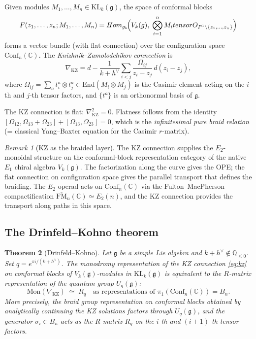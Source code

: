 \documentclass[11pt]{article}
\newtheorem{theorem}{Theorem}[section]
\theoremstyle{definition}
\theoremstyle{remark}
\newtheorem{remark}[theorem]{Remark}
\newcommand{\Uq}{U_q}
\newcommand{\FM}{\overline{\mathrm{FM}}}
\providecommand{\End}{}
\renewcommand{\End}{\mathrm{End}}
\providecommand{\Hom}{}
\renewcommand{\Hom}{\mathrm{Hom}}
\newcommand{\cF}{\mathcal{F}}
\newcommand{\cO}{\mathcal{O}}
\newcommand{\frakg}{\mathfrak{g}}
\newcommand{\KL}{\mathrm{KL}}
\newcommand{\KZ}{\mathrm{KZ}}
\newcommand{\hv}{h^\vee}
\begin{document}
Given modules $M_1, \ldots, M_n \in \KL_k(\frakg)$, the space of
conformal blocks
\[
 \cF(z_1, \ldots, z_n; M_1, \ldots, M_n)
 = \Hom_{\hat{\frakg}_k}\!\Bigl(V_k(\frakg),\;
 \bigotimes_{i=1}^n M_i \otimes \cO_{\mathbb{P}^1 \setminus \{z_1,\ldots,z_n\}}\Bigr)
\]
forms a vector bundle (with flat connection) over the configuration space
$\mathrm{Conf}_n(\mathbb{C})$. The \emph{Knizhnik--Zamolodchikov connection} is
\begin{equation}\label{eq:kz}
 \nabla_{\KZ} = d - \frac{1}{k + \hv} \sum_{i < j}
 \frac{\Omega_{ij}}{z_i - z_j}\, d(z_i - z_j),
\end{equation}
where $\Omega_{ij} = \sum_a t^a_i \otimes t^a_j \in \End(M_i \otimes M_j)$
is the Casimir element acting on the $i$-th and $j$-th tensor factors,
and $\{t^a\}$ is an orthonormal basis of $\frakg$.

The KZ connection is flat: $\nabla_{\KZ}^2 = 0$. Flatness follows from
the identity $[\Omega_{12}, \Omega_{13} + \Omega_{23}] + [\Omega_{13}, \Omega_{23}] = 0$,
which is the \emph{infinitesimal pure braid relation} (= classical Yang--Baxter
equation for the Casimir $r$-matrix).

\begin{remark}[KZ as the braided layer]
\label{rem:kz-e2}
The KZ connection supplies the $E_2$-monoidal structure on the
conformal-block representation category of the native $E_1$ chiral
algebra $V_k(\frakg)$. The factorization along the curve gives the OPE;
the flat connection on configuration space gives the parallel transport
that defines the braiding. The $E_2$-operad acts on $\mathrm{Conf}_n(\mathbb{C})$
via the Fulton--MacPherson compactification $\FM_n(\mathbb{C}) \simeq E_2(n)$,
and the KZ connection provides the transport along paths in this space.
\end{remark}

\subsection{The Drinfeld--Kohno theorem}
\label{subsec:dk-theorem}

\begin{theorem}[Drinfeld--Kohno]
\label{thm:drinfeld-kohno}
Let $\frakg$ be a simple Lie algebra and $k + \hv \notin \mathbb{Q}_{\le 0}$.
Set $q = e^{\pi i/(k+\hv)}$. The monodromy representation of the
KZ connection \eqref{eq:kz} on conformal blocks of $V_k(\frakg)$-modules
in $\KL_k(\frakg)$ is equivalent to the $R$-matrix representation of the
quantum group $\Uq(\frakg)$:
\[
 \mathrm{Mon}(\nabla_{\KZ}) \;\simeq\; R_q
 \quad \text{as representations of } \pi_1(\mathrm{Conf}_n(\mathbb{C})) = B_n.
\]
More precisely, the braid group representation on conformal blocks
obtained by analytically continuing the KZ solutions factors through
$\Uq(\frakg)$, and the generator $\sigma_i \in B_n$ acts as the
$R$-matrix $R_q$ on the $i$-th and $(i+1)$-th tensor factors.
\end{theorem}
\end{document}
